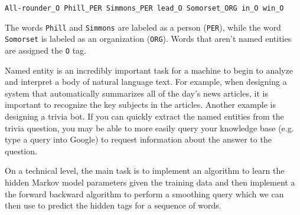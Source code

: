 \documentclass[11pt,addpoints,answers]{exam}
\begin{document}
\texttt{All-rounder\_O Phill\_PER Simmons\_PER lead\_O Somorset\_ORG in\_O win\_O}

The words \texttt{Phill} and \texttt{Simmons} are labeled as a person (\texttt{PER}), while the word \texttt{Somorset} is labeled as an organization (\texttt{ORG}). Words that aren't named entities are assigned the \texttt{O} tag.

Named entity is an incredibly important task for a machine to begin to analyze and interpret a body of natural language text. For example, when designing a system that automatically summarizes all of the day's news articles, it is important to recognize the key subjects in the articles. Another example is designing a trivia bot. If you can quickly extract the named entities from the trivia question, you may be able to more easily query your knowledge base (e.g. type a query into Google) to request information about the answer to the question.

On a technical level, the main task is to implement an algorithm to learn the hidden Markov model parameters given the training data and then implement a the forward backward algorithm to perform a smoothing query which we can then use to predict the hidden tags for a sequence of words. 
\end{document}
